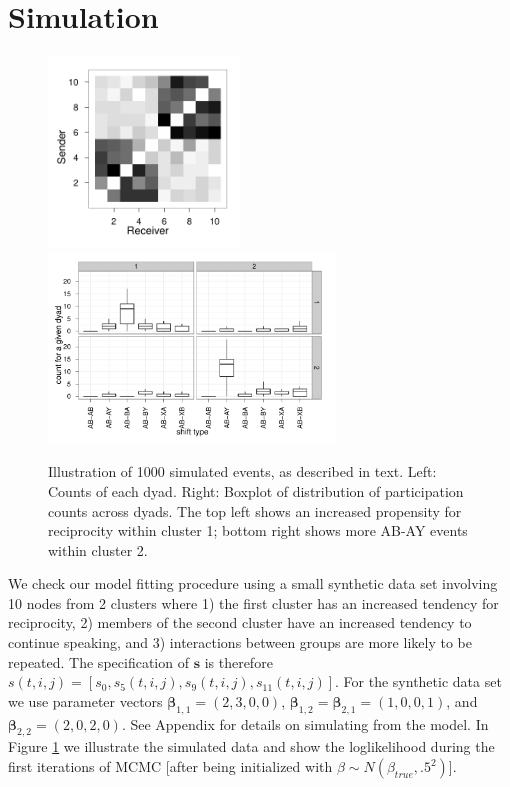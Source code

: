 \documentclass[11pt]{article}
\begin{document}



\section{Simulation}
\begin{figure}
\center
\includegraphics[width=2in]{../figs/syn/mat.pdf}
\includegraphics[width=3in]{../figs/syn/counts.pdf}
\caption{Illustration of 1000 simulated events, as described in text. Left: Counts of each dyad. Right: Boxplot of distribution of participation counts across dyads.  The top left shows an increased propensity for reciprocity within cluster 1; bottom right shows more AB-AY events within cluster 2.}
\label{fig:syncounts}
\end{figure}

We check our model fitting procedure using a small synthetic data set involving 10 nodes from 2 clusters where 1) the first cluster has an increased tendency for reciprocity, 2) members of the second cluster have an increased tendency to continue speaking, and 3) interactions between groups are more likely to be repeated.  The specification of $\textbf{s}$ is therefore $s(t,i,j) = [s_0, s_{5}(t,i,j), s_{9}(t,i,j), s_{11}(t,i,j)]$.  For the synthetic data set we use parameter vectors $\boldsymbol{\beta}_{1,1} = (2,3,0,0)$,  $\boldsymbol{\beta}_{1,2} = \boldsymbol{\beta}_{2,1} = (1,0,0,1)$, and $\boldsymbol{\beta}_{2,2} = (2,0,2,0)$.  See Appendix for details on simulating from the model.  In Figure \ref{fig:syncounts} we illustrate the simulated data and show the loglikelihood during the first iterations of MCMC [after being initialized with $\beta \sim N(\beta_{true},.5^2)$].
\end{document}
